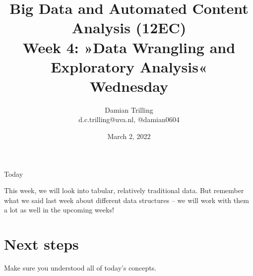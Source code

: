 

\graphicspath{{../../resources/img/}}




\title[Big Data and Automated Content Analysis]{\textbf{Big Data and Automated Content Analysis (12EC)} 
\\Week 4: »Data Wrangling and Exploratory Analysis«
\\Wednesday}
\author[Damian Trilling]{Damian Trilling\\ \footnotesize{d.c.trilling@uva.nl, @damian0604 \\}}
\date{March 2, 2022}


\begin{frame}{}
	\titlepage
\end{frame}

\begin{frame}{Today}
	\tableofcontents
\end{frame}




\begin{frame}[standout]
This week, we will look into tabular, relatively traditional data. But remember what we said last week about different data structures -- we will work with them a lot as well in the upcoming weeks!

\end{frame}











\section{Next steps}

\begin{frame}[standout]
Make sure you understood all of today's concepts.


\end{frame}





\begin{frame}
	\printbibliography
\end{frame}





